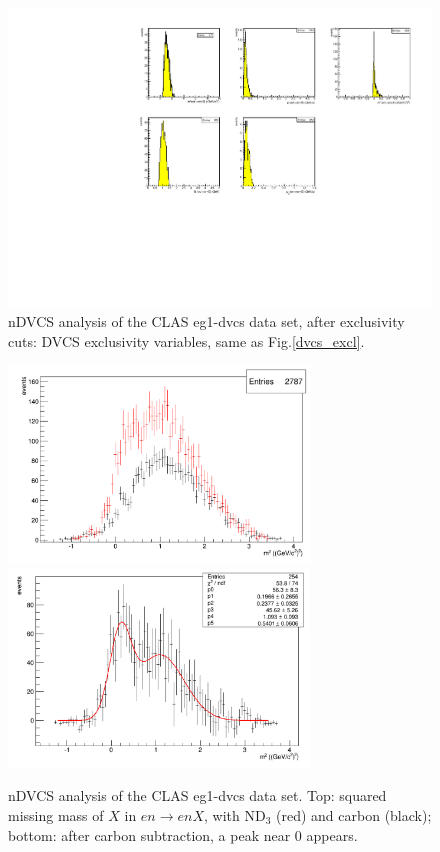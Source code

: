 \begin{figure}
\begin{center}
\includegraphics[width=120mm]{nDVCS_data_exclusivity.pdf}
\caption[nDVCS, CLAS eg1-dvcs analysis]
{nDVCS analysis of the CLAS eg1-dvcs data set, after exclusivity cuts: DVCS exclusivity variables, same as Fig.\ref{dvcs_excl}.}
\label{ndvcs_daria}
\end{center}
\end{figure}

\begin{figure}
\begin{center}
\includegraphics[width=80mm]{mm2_en.pdf}
\includegraphics[width=80mm]{mm2_en_fit.pdf}
\caption 
{nDVCS analysis of the CLAS eg1-dvcs data set. Top: squared missing mass of $X$ in $en\to enX$, with ND$_{3}$ (red) and carbon (black); bottom: after carbon subtraction, a peak near 0 appears. }   
\label{daria_sub}
\end{center}
\end{figure}

